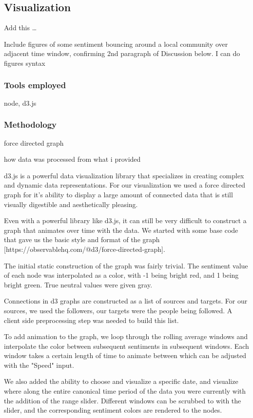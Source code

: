 \documentclass[11pt]{article}
\begin{document}
\subsection{Visualization}
Add this \dots\newline

Include figures of some sentiment bouncing around a local community over adjacent time window, confirming 2nd paragraph of Discussion below. I can do figures syntax

\subsubsection{Tools employed}
node, d3.js

\subsubsection{Methodology}
force directed graph\newline

how data was processed from what i provided

d3.js is a powerful data visualization library that specializes in creating complex and dynamic data representations.
For our visualization we used a force directed graph for it's ability to display a large amount of connected data that is still
visually digestible and aesthetically pleasing.

Even with a powerful library like d3.js, it can still be very difficult to construct a graph that animates over time with the data.
We started with some base code that gave us the basic style and format of the graph [https://observablehq.com/@d3/force-directed-graph].

The initial static construction of the graph was fairly trivial. The sentiment value of each node was interpolated as a color, with -1
being bright red, and 1 being bright green. True neutral values were given gray.

Connections in d3 graphs are constructed as a list of sources and targets. For our sources, we used the followers, our targets 
were the people being followed. A client side preprocessing step was needed to build this list.

To add animation to the graph, we loop through the rolling average windows and interpolate the color between subsequent sentiments
in subsequent windows. Each window takes a certain length of time to animate between which can be adjusted with the "Speed" input.

We also added the ability to choose and visualize a specific date, and visualize where along the entire canonical time period of the data
you were currently with the addition of the range slider. Different windows can be scrubbed to with the slider, and the corresponding
sentiment colors are rendered to the nodes.
\end{document}

